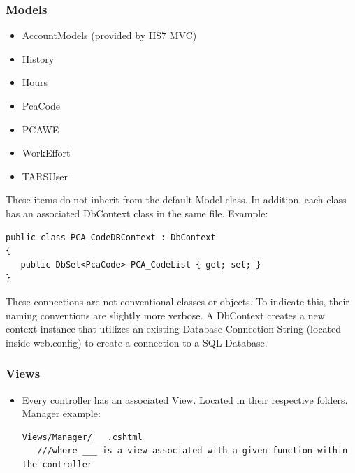 \documentclass[letterpaper]{article}
\begin{document}
\subsubsection{Models}
\begin{itemize}
\item AccountModels (provided by IIS7 MVC)
\item History
\item Hours
\item PcaCode
\item PCAWE
\item WorkEffort
\item TARSUser
\end{itemize}
These items do not inherit from the default Model class. In addition, each class has an associated DbContext class in the same file. Example:
\begin{verbatim}
public class PCA_CodeDBContext : DbContext
{
   public DbSet<PcaCode> PCA_CodeList { get; set; }
}
\end{verbatim}
These connections are not conventional classes or objects. To indicate this, their naming conventions are slightly more verbose. A DbContext creates a new context instance that utilizes an existing Database Connection String (located inside web.config) to create a connection to a SQL Database.
\subsubsection{Views}
\begin{itemize}
\item Every controller has an associated View. Located in their respective folders. Manager example:
\begin{verbatim}
Views/Manager/___.cshtml 
   ///where ___ is a view associated with a given function within the controller
\end{verbatim}
\end{itemize}
\end{document}
